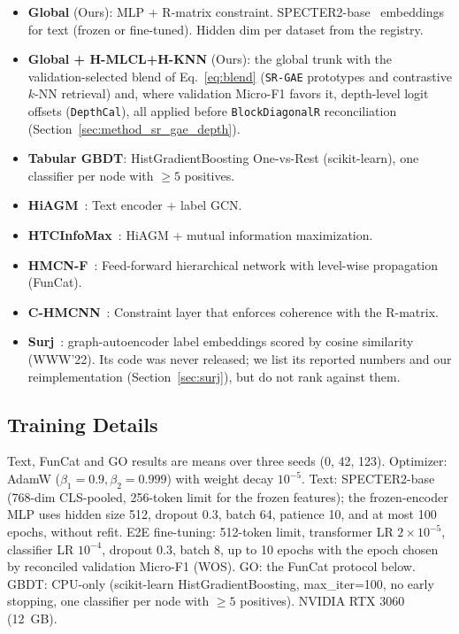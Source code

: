 \documentclass[preprint,12pt]{elsarticle}
\begin{document}
\begin{itemize}[leftmargin=*,nosep]
  \item \textbf{Global} (Ours): MLP + R-matrix constraint.
    SPECTER2-base~\cite{specter2} embeddings for text (frozen or
    fine-tuned). Hidden dim per dataset from the registry.
  \item \textbf{Global + H-MLCL+H-KNN} (Ours): the global trunk with the
    validation-selected blend of Eq.~\eqref{eq:blend} (\texttt{SR-GAE}
    prototypes and contrastive $k$-NN retrieval) and, where validation
    Micro-F1 favors it, depth-level logit offsets (\texttt{DepthCal}), all
    applied before \texttt{BlockDiagonalR} reconciliation
    (Section~\ref{sec:method_sr_gae_depth}).
  \item \textbf{Tabular GBDT}: HistGradientBoosting One-vs-Rest
    (scikit-learn), one classifier per node with $\geq 5$ positives.
  \item \textbf{HiAGM}~\cite{zhou2020hiagm}: Text encoder + label GCN.
  \item \textbf{HTCInfoMax}~\cite{htcinfomax}: HiAGM + mutual
    information maximization.
  \item \textbf{HMCN-F}~\cite{weihs2018hmc}: Feed-forward hierarchical
    network with level-wise propagation (FunCat).
  \item \textbf{C-HMCNN}~\cite{chmcnn}: Constraint layer that enforces
    coherence with the R-matrix.
  \item \textbf{Surj}~\cite{www2022ontology}: graph-autoencoder label
    embeddings scored by cosine similarity (WWW'22).  Its code was never
    released; we list its reported numbers and our reimplementation
    (Section~\ref{sec:surj}), but do not rank against them.
\end{itemize}

\subsection{Training Details}

Text, FunCat and GO results are means over three seeds (0, 42, 123).
Optimizer: AdamW ($\beta_1=0.9, \beta_2=0.999$)
with weight decay $10^{-5}$. Text: SPECTER2-base (768-dim CLS-pooled,
256-token limit for the frozen features); the frozen-encoder MLP uses hidden
size 512, dropout 0.3, batch 64, patience 10, and at most 100 epochs, without
refit.
E2E fine-tuning: 512-token limit, transformer LR $2\times10^{-5}$, classifier LR
$10^{-4}$, dropout 0.3, batch 8, up to 10 epochs with the epoch chosen by
reconciled validation Micro-F1 (WOS). GO: the FunCat protocol below. GBDT: CPU-only (scikit-learn
HistGradientBoosting, max\_iter=100, no early stopping, one classifier
per node with $\geq 5$ positives). NVIDIA RTX 3060 (12~GB).
\end{document}
